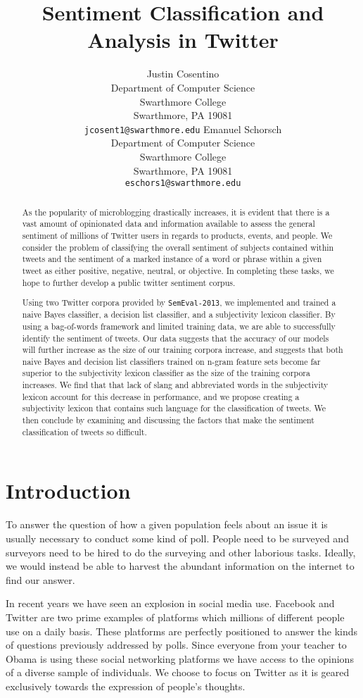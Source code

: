 \documentclass[11pt]{article}
\title{Sentiment Classification and Analysis in Twitter}
\author{Justin Cosentino\\
  Department of Computer Science\\
  Swarthmore College\\
  Swarthmore, PA 19081\\
  {\tt jcosent1@swarthmore.edu}  
  \And                            
  Emanuel Schorsch\\                 
  Department of Computer Science\\
  Swarthmore College\\
  Swarthmore, PA 19081\\
  {\tt eschors1@swarthmore.edu}}
\date{}
\begin{document}
\maketitle
\begin{abstract}
As the popularity of microblogging drastically increases, it is evident that there is a vast amount of opinionated data and information available to assess the general sentiment of millions of Twitter users in regards to products, events, and people. We consider the problem of classifying the overall sentiment of subjects contained within tweets and the sentiment of a marked instance of a word or phrase within a given tweet as either positive, negative, neutral, or objective. In completing these tasks, we hope to further develop a public twitter sentiment corpus.

Using two Twitter corpora provided by {\tt SemEval-2013}, we implemented and trained a naive Bayes classifier, a decision list classifier, and a subjectivity lexicon classifier. By using a bag-of-words framework and limited training data, we are able to successfully identify the sentiment of tweets. Our data suggests that the accuracy of our models will further increase as the size of our training corpora increase, and suggests that both naive Bayes and decision list classifiers trained on n-gram feature sets become far superior to the subjectivity lexicon classifier as the size of the training corpora increases. We find that that lack of slang and abbreviated words in the subjectivity lexicon account for this decrease in performance, and we propose creating a subjectivity lexicon that contains such language for the classification of tweets. We then conclude by examining and discussing the factors that make the sentiment classification of tweets so difficult. 

\end{abstract}

\section{Introduction}
To answer the question of how a given population feels about an issue it is usually necessary to conduct some kind of poll. People need to be surveyed and surveyors need to be hired to do the surveying and other laborious tasks. Ideally,  we would instead be able to harvest the abundant information on the internet to find our answer. 

In recent years we have seen an explosion in social media use. Facebook and Twitter are two prime examples of platforms which millions of different people use on a daily basis. These platforms are perfectly positioned to answer the kinds of questions previously addressed by polls. Since everyone from your teacher to Obama is using these social networking platforms we have access to the opinions of a diverse sample of individuals. We choose to focus on Twitter as it is geared exclusively towards the expression of people's thoughts.  
\end{document}

